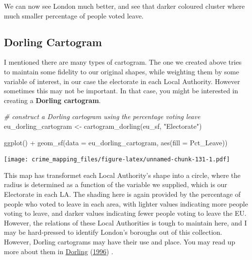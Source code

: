\documentclass[
]{book}
\newenvironment{Shaded}{\begin{snugshade}}{\end{snugshade}}
\newcommand{\AttributeTok}[1]{\textcolor[rgb]{0.77,0.63,0.00}{#1}}
\newcommand{\CommentTok}[1]{\textcolor[rgb]{0.56,0.35,0.01}{\textit{#1}}}
\newcommand{\FunctionTok}[1]{\textcolor[rgb]{0.00,0.00,0.00}{#1}}
\newcommand{\NormalTok}[1]{#1}
\newcommand{\OtherTok}[1]{\textcolor[rgb]{0.56,0.35,0.01}{#1}}
\newcommand{\SpecialCharTok}[1]{\textcolor[rgb]{0.00,0.00,0.00}{#1}}
\newcommand{\StringTok}[1]{\textcolor[rgb]{0.31,0.60,0.02}{#1}}
\begin{document}
We can now see London much better, and see that darker coloured cluster where much smaller percentage of people voted leave.

\hypertarget{dorling-cartogram}{%
\subsection{Dorling Cartogram}\label{dorling-cartogram}}

I mentioned there are many types of cartogram. The one we created above tries to maintain some fidelity to our original shapes, while weighting them by some variable of interest, in our case the electorate in each Local Authority. However sometimes this may not be important. In that case, you might be interested in creating a \textbf{Dorling cartogram}.

\begin{Shaded}
\begin{Highlighting}[]
\CommentTok{\# construct a Dorling cartogram using the percentage voting leave}
\NormalTok{eu\_dorling\_cartogram }\OtherTok{\textless{}{-}} \FunctionTok{cartogram\_dorling}\NormalTok{(eu\_sf, }\StringTok{"Electorate"}\NormalTok{)}
\end{Highlighting}
\end{Shaded}

\begin{Shaded}
\begin{Highlighting}[]
\FunctionTok{ggplot}\NormalTok{() }\SpecialCharTok{+}
  \FunctionTok{geom\_sf}\NormalTok{(}\AttributeTok{data =}\NormalTok{ eu\_dorling\_cartogram, }\FunctionTok{aes}\NormalTok{(}\AttributeTok{fill =}\NormalTok{ Pct\_Leave)) }
\end{Highlighting}
\end{Shaded}

\texttt{[image: crime\_mapping\_files/figure-latex/unnamed-chunk-131-1.pdf]}

This map has transformet each Local Authority's shape into a circle, where the radius is determined as a function of the variable we supplied, which is our Electorate in each LA. The shading here is again provided by the percentage of people who voted to leave in each area, with lighter values indicating more people voting to leave, and darker values indicating fewer people voting to leave the EU. However, the relations of these Local Authorities is tough to maintain here, and I may be hard-pressed to identify London's boroughs out of this collection. However, Dorling cartograms may have their use and place. You may read up more about them in \protect\hyperlink{ref-Dorling_1996}{Dorling} (\protect\hyperlink{ref-Dorling_1996}{1996}) .
\end{document}
